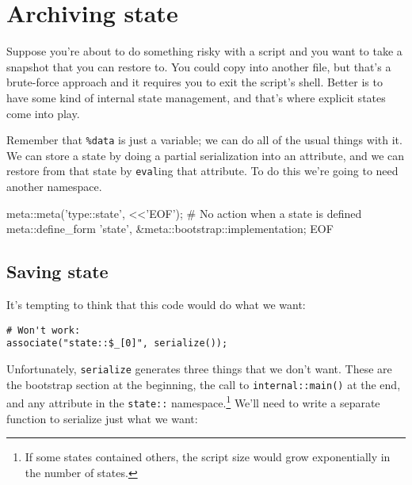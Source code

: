 \documentclass{report}
\begin{document}
\chapter{Archiving state}\label{sec:archiving-state}
  Suppose you're about to do something risky with a script and you want to take a snapshot that you can restore to. You could copy into another file, but that's a brute-force approach and it
  requires you to exit the script's shell. Better is to have some kind of internal state management, and that's where explicit states come into play.

  Remember that \verb|%data| is just a variable; we can do all of the usual things with it. We can store a state by doing a partial serialization into an attribute, and we can restore from
  that state by {\tt eval}ing that attribute. To do this we're going to need another namespace.

\begin{perlcode}
meta::meta('type::state', <<'EOF');
# No action when a state is defined
meta::define_form 'state', \&meta::bootstrap::implementation;
EOF \end{perlcode}

\section{Saving state}\label{sec:archiving-state-saving}
    It's tempting to think that this code would do what we want:

\begin{verbatim}
# Won't work:
associate("state::$_[0]", serialize());
\end{verbatim}

    Unfortunately, {\tt serialize} generates three things that we don't want. These are the bootstrap section at the beginning, the call to {\tt internal::main()} at the end, and any attribute
    in the {\tt state::} namespace.\footnote{If some states contained others, the script size would grow exponentially in the number of states.} We'll need to write a separate function to
    serialize just what we want:
\end{document}
